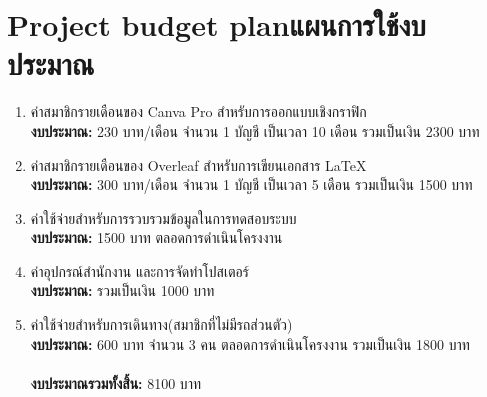 \section{\ifenglish Project budget plan\else แผนการใช้งบประมาณ\fi}
\begin{enumerate}
    \item ค่าสมาชิกรายเดือนของ Canva Pro สำหรับการออกแบบเชิงกราฟิก\\
    \textbf{งบประมาณ:} 230 บาท/เดือน จำนวน 1 บัญชี เป็นเวลา 10 เดือน รวมเป็นเงิน 2300 บาท
    \item ค่าสมาชิกรายเดือนของ Overleaf สำหรับการเขียนเอกสาร \LaTeX \\
    \textbf{งบประมาณ:} 300 บาท/เดือน จำนวน 1 บัญชี เป็นเวลา 5 เดือน รวมเป็นเงิน 1500 บาท
    \item ค่าใช้จ่ายสำหรับการรวบรวมข้อมูลในการทดสอบระบบ\\
    \textbf{งบประมาณ:} 1500 บาท ตลอดการดำเนินโครงงาน
    \item ค่าอุปกรณ์สำนักงาน และการจัดทำโปสเตอร์\\
    \textbf{งบประมาณ:} รวมเป็นเงิน 1000 บาท
    \item ค่าใช้จ่ายสำหรับการเดินทาง(สมาชิกที่ไม่มีรถส่วนตัว)\\
    \textbf{งบประมาณ:} 600 บาท จำนวน 3 คน ตลอดการดำเนินโครงงาน รวมเป็นเงิน 1800 บาท\\ \\
    \textbf{งบประมาณรวมทั้งสิ้น:} 8100 บาท

\end{enumerate}
